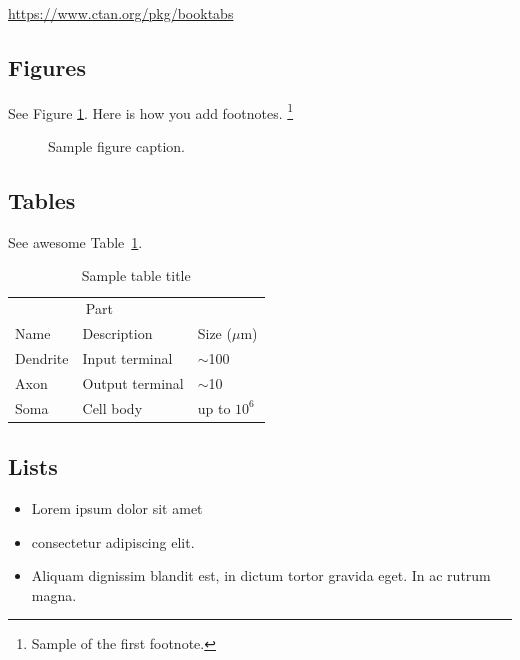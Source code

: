 \documentclass{article}
\begin{document}
\begin{center}
  \url{https://www.ctan.org/pkg/booktabs}
\end{center}


\subsection{Figures}
\lipsum[10] 
See Figure \ref{fig:fig1}. Here is how you add footnotes. \footnote{Sample of the first footnote.}
\lipsum[11] 

\begin{figure}
  \centering
  \fbox{\rule[-.5cm]{4cm}{4cm} \rule[-.5cm]{4cm}{0cm}}
  \caption{Sample figure caption.}
  \label{fig:fig1}
\end{figure}

\subsection{Tables}
\lipsum[12]
See awesome Table~\ref{tab:table}.

\begin{table}
 \caption{Sample table title}
  \centering
  \begin{tabular}{lll}
    \toprule
    \multicolumn{2}{c}{Part}                   \\
    \cmidrule(r){1-2}
    Name     & Description     & Size ($\mu$m) \\
    \midrule
    Dendrite & Input terminal  & $\sim$100     \\
    Axon     & Output terminal & $\sim$10      \\
    Soma     & Cell body       & up to $10^6$  \\
    \bottomrule
  \end{tabular}
  \label{tab:table}
\end{table}

\subsection{Lists}
\begin{itemize}
\item Lorem ipsum dolor sit amet
\item consectetur adipiscing elit. 
\item Aliquam dignissim blandit est, in dictum tortor gravida eget. In ac rutrum magna.
\end{itemize}


  
\end{document}
